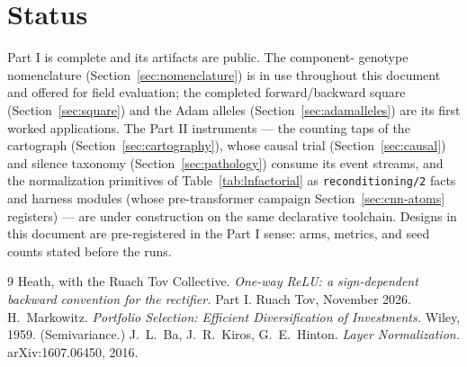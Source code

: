 \documentclass[11pt]{article}
\begin{document}
\section{Status}

Part I is complete and its artifacts are public. The component-
genotype nomenclature (Section~\ref{sec:nomenclature}) is in use
throughout this document and offered for field evaluation; the
completed forward/backward square (Section~\ref{sec:square}) and
the Adam alleles (Section~\ref{sec:adamalleles}) are its first
worked applications. The Part II
instruments --- the counting taps of the cartograph
(Section~\ref{sec:cartography}), whose causal trial
(Section~\ref{sec:causal}) and silence taxonomy
(Section~\ref{sec:pathology}) consume its event streams, and the
normalization primitives of Table~\ref{tab:lnfactorial} as
\texttt{reconditioning/2} facts and harness modules (whose
pre-transformer campaign Section~\ref{sec:cnn-atoms} registers) --- are under
construction on the same declarative toolchain. Designs in this
document are pre-registered in the Part I sense: arms, metrics, and
seed counts stated before the runs.

\begin{thebibliography}{9}
 Heath, with the Ruach Tov Collective.
\emph{One-way ReLU: a sign-dependent backward convention for the
rectifier.} Part I. Ruach Tov, November 2026.
 H.~Markowitz.
\emph{Portfolio Selection: Efficient Diversification of
Investments.} Wiley, 1959. (Semivariance.)
 J.~L.~Ba, J.~R.~Kiros, G.~E.~Hinton.
\emph{Layer Normalization.} arXiv:1607.06450, 2016.
\end{thebibliography}
\end{document}

